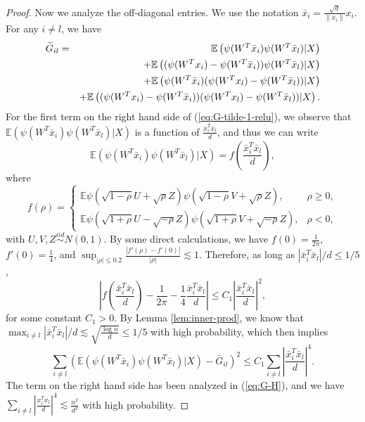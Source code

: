 \begin{proof}
Now we analyze the off-diagonal entries. We use the notation $\bar{x}_i=\frac{\sqrt{d}}{\|x_i\|}x_i$. For any $i\neq l$, we have
\begin{eqnarray}
\label{eq:G-tilde-1-relu} \wt{G}_{il} &=& \mathbb{E}\left(\psi(W^T\bar{x}_i)\psi(W^T\bar{x}_l)|X\right) \\
\label{eq:G-tilde-2-relu} && + \mathbb{E}\left((\psi(W^Tx_i)-\psi(W^T\bar{x}_i))\psi(W^T\bar{x}_l)|X\right) \\
\label{eq:G-tilde-3-relu} && + \mathbb{E}\left(\psi(W^T\bar{x}_i)(\psi(W^Tx_l)-\psi(W^T\bar{x}_l))|X\right) \\
\label{eq:G-tilde-4-relu} && + \mathbb{E}\left((\psi(W^Tx_i)-\psi(W^T\bar{x}_i))(\psi(W^Tx_l)-\psi(W^T\bar{x}_l))|X\right).
\end{eqnarray}
For the first term on the right hand side of (\ref{eq:G-tilde-1-relu}), we observe that $\mathbb{E}\left(\psi(W^T\bar{x}_i)\psi(W^T\bar{x}_l)|X\right)$ is a function of $\frac{\bar{x}_i^T\bar{x}_l}{d}$, and thus we can write
$$\mathbb{E}\left(\psi(W^T\bar{x}_i)\psi(W^T\bar{x}_l)|X\right)=f\left(\frac{\bar{x}_i^T\bar{x}_l}{d}\right),$$
where
$$f(\rho) = \begin{cases}
\mathbb{E}\psi(\sqrt{1-\rho}U+\sqrt{\rho}Z)\psi(\sqrt{1-\rho}V+\sqrt{\rho}Z), & \rho \geq 0, \\
\mathbb{E}\psi(\sqrt{1+\rho}U-\sqrt{-\rho}Z)\psi(\sqrt{1+\rho}V+\sqrt{-\rho}Z), & \rho < 0,
\end{cases}$$
with $U,V,Z\stackrel{iid}{\sim} N(0,1)$. By some direct calculations, we have $f(0)=\frac{1}{2\pi}$, $f'(0)=\frac{1}{4}$, and $\sup_{|\rho|\leq 0.2}\frac{|f'(\rho)-f'(0)|}{|\rho|}\lesssim 1$. Therefore, as long as $|\bar{x}_i^T\bar{x}_l|/d\leq 1/5$,
$$\left|f\left(\frac{\bar{x}_i^T\bar{x}_l}{d}\right)-\frac{1}{2\pi}-\frac{1}{4}\frac{\bar{x}_i^T\bar{x}_l}{d}\right|\leq C_1\left|\frac{\bar{x}_i^T\bar{x}_l}{d}\right|^2,$$
for some constant $C_1>0$. By Lemma \ref{lem:inner-prod}, we know that $\max_{i\neq l}|\bar{x}_i^T\bar{x}_l|/d\lesssim \sqrt{\frac{\log n}{d}}\leq 1/5$ with high probability, which then implies
\begin{equation}
\sum_{i\neq l}\left(\mathbb{E}\left(\psi(W^T\bar{x}_i)\psi(W^T\bar{x}_l)|X\right)-\bar{G}_{il}\right)^2 \leq C_1\sum_{i\neq l}\left|\frac{\bar{x}_i^T\bar{x}_l}{d}\right|^4.\label{eq:4th-bd-later}
\end{equation}
The term on the right hand side has been analyzed in (\ref{eq:G-H}), and we have $\sum_{i\neq l}\left|\frac{x_i^Tx_l}{d}\right|^4\lesssim \frac{n^2}{d^2}$ with high probability.


\end{proof}
